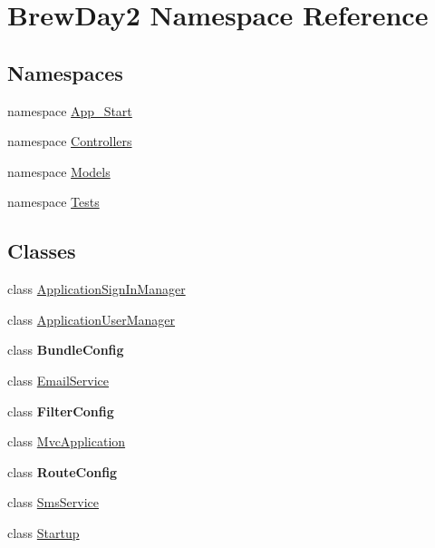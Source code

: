 \hypertarget{namespace_brew_day2}{}\section{Brew\+Day2 Namespace Reference}
\label{namespace_brew_day2}
\subsection*{Namespaces}
\begin{DoxyCompactItemize}
\item 
namespace \mbox{\hyperlink{namespace_brew_day2_1_1_app___start}{App\+\_\+\+Start}}
\item 
namespace \mbox{\hyperlink{namespace_brew_day2_1_1_controllers}{Controllers}}
\item 
namespace \mbox{\hyperlink{namespace_brew_day2_1_1_models}{Models}}
\item 
namespace \mbox{\hyperlink{namespace_brew_day2_1_1_tests}{Tests}}
\end{DoxyCompactItemize}
\subsection*{Classes}
\begin{DoxyCompactItemize}
\item 
class \mbox{\hyperlink{class_brew_day2_1_1_application_sign_in_manager}{Application\+Sign\+In\+Manager}}
\item 
class \mbox{\hyperlink{class_brew_day2_1_1_application_user_manager}{Application\+User\+Manager}}
\item 
class {\bfseries Bundle\+Config}
\item 
class \mbox{\hyperlink{class_brew_day2_1_1_email_service}{Email\+Service}}
\item 
class {\bfseries Filter\+Config}
\item 
class \mbox{\hyperlink{class_brew_day2_1_1_mvc_application}{Mvc\+Application}}
\item 
class {\bfseries Route\+Config}
\item 
class \mbox{\hyperlink{class_brew_day2_1_1_sms_service}{Sms\+Service}}
\item 
class \mbox{\hyperlink{class_brew_day2_1_1_startup}{Startup}}
\end{DoxyCompactItemize}
